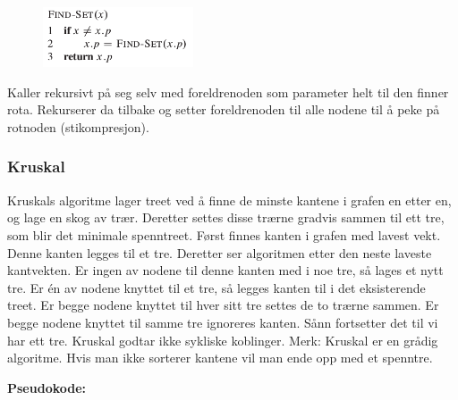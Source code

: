 \documentclass[12pt]{report}
\begin{document}

\begin{figure}[H]
	\begin{Center}
		\includegraphics[width=1.75in,height=0.7in]{./media/image117.png}
	\end{Center}
\end{figure}



\par

Kaller rekursivt på seg selv med foreldrenoden som parameter helt til den finner rota. Rekurserer da tilbake og setter foreldrenoden til alle nodene til å peke på rotnoden (stikompresjon). 


\newpage
\par

\subsubsection*{Kruskal}
Kruskals algoritme lager treet ved å finne de minste kantene i grafen en etter en, og lage en skog av trær. Deretter settes disse trærne gradvis sammen til ett tre, som blir det minimale spenntreet. Først finnes kanten i grafen med lavest vekt. Denne kanten legges til et tre. Deretter ser algoritmen etter den neste laveste kantvekten. Er ingen av nodene til denne kanten med i noe tre, så lages et nytt tre. Er én av nodene knyttet til et tre, så legges kanten til i det eksisterende treet. Er begge nodene knyttet til hver sitt tre settes de to trærne sammen. Er begge nodene knyttet til samme tre ignoreres kanten. Sånn fortsetter det til vi har ett tre. Kruskal godtar ikke sykliske koblinger. Merk: Kruskal er en grådig algoritme. Hvis man ikke sorterer kantene vil man ende opp med et spenntre.\par

{\fontsize{13pt}{15.6pt}\selectfont \textbf{Pseudokode:}\par}\par
\end{document}
